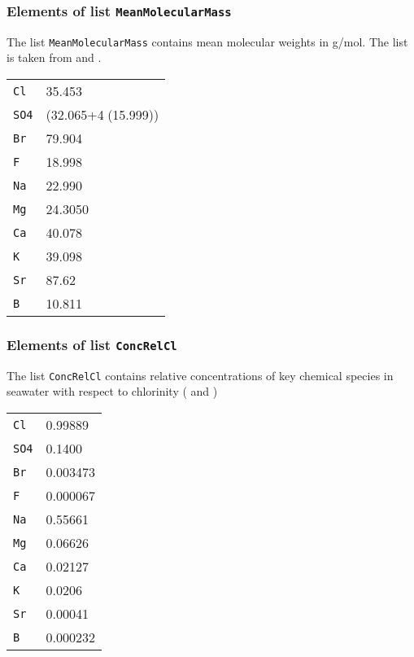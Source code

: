 \documentclass[a4paper]{article}
\begin{document}
\subsubsection{Elements of list \texttt{MeanMolecularMass}}
The list  \texttt{MeanMolecularMass} contains mean molecular weights in g/mol. The list is taken from \citet[chap. 5, p. 3]{DOE1994} and \citet[chap. 5, p. 4]{Dickson2007}.\\
\begin{center}
\begin{tabular}{|ll|} \hline
\texttt{Cl}  & 35.453\\
\texttt{SO4} & (32.065+4$\;$(15.999))\\
\texttt{Br}  & 79.904\\
\texttt{F}   & 18.998\\
\texttt{Na}  & 22.990\\
\texttt{Mg}  & 24.3050\\
\texttt{Ca}  & 40.078\\
\texttt{K}   & 39.098\\
\texttt{Sr}  & 87.62\\
\texttt{B}   & 10.811\\ \hline
\end{tabular}
\end{center}

\subsubsection{Elements of list \texttt{ConcRelCl}}
The list \texttt{ConcRelCl} contains relative concentrations of key chemical species in seawater with respect to chlorinity (\citet[chap. 5, p. 11]{DOE1994} and \citet[chap. 5, p. 10]{Dickson2007})\\
\begin{center}
\begin{tabular}{|ll|} \hline
\texttt{Cl}  & 0.99889\\
\texttt{SO4} & 0.1400\\
\texttt{Br}  & 0.003473\\
\texttt{F}   & 0.000067\\
\texttt{Na}  & 0.55661\\
\texttt{Mg}  & 0.06626\\
\texttt{Ca}  & 0.02127\\
\texttt{K}   & 0.0206\\
\texttt{Sr}  & 0.00041\\
\texttt{B}   & 0.000232\\ \hline
\end{tabular}
\end{center}
\end{document}
